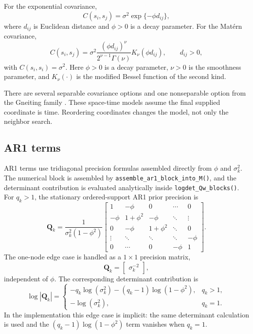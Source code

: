\documentclass[11pt]{article}
\newcommand{\bQ}{\bm{Q}}
\begin{document}
For the exponential covariance,
\begin{equation}
  C(s_i,s_j) = \sigma^2 \exp\{-\phi d_{ij}\},
\end{equation}
where $d_{ij}$ is Euclidean distance and $\phi>0$ is a decay parameter. For the Mat{\'e}rn covariance,
\begin{equation}
  C(s_i,s_j)
    =
    \sigma^2
    \frac{(\phi d_{ij})^\nu}
         {2^{\nu-1}\Gamma(\nu)}
    K_\nu(\phi d_{ij}),
    \qquad d_{ij}>0,
\end{equation}
with $C(s_i,s_i)=\sigma^2$. Here $\phi>0$ is a decay parameter, $\nu>0$ is the smoothness parameter, and $K_\nu(\cdot)$ is the modified Bessel function of the second kind.

There are several separable covariance options and one nonseparable option from the Gneiting family \citep{Gneiting2002}. These space-time models assume the final supplied coordinate is time. Reordering coordinates changes the model, not only the neighbor search.

\subsection{AR1 terms}

AR1 terms use tridiagonal precision formulas assembled directly from $\phi$ and $\sigma_k^2$. The numerical block is assembled by \texttt{assemble\_ar1\_block\_into\_M()}, and the determinant contribution is evaluated analytically inside \texttt{logdet\_Qw\_blocks()}. For $q_k>1$, the stationary ordered-support AR1 prior precision is
\begin{equation}
  \bQ_k =
  \frac{1}{\sigma_k^2(1-\phi^2)}
  \begin{bmatrix}
    1 & -\phi & 0 & \cdots & 0 \\
    -\phi & 1+\phi^2 & -\phi & \ddots & \vdots \\
    0 & -\phi & 1+\phi^2 & \ddots & 0 \\
    \vdots & \ddots & \ddots & \ddots & -\phi \\
    0 & \cdots & 0 & -\phi & 1
  \end{bmatrix}.
\end{equation}
The one-node edge case is handled as a $1\times 1$ precision matrix,
\begin{equation}
  \bQ_k = \begin{bmatrix}\sigma_k^{-2}\end{bmatrix},
\end{equation}
independent of $\phi$.
The corresponding determinant contribution is
\begin{equation}
  \label{eq:logdet-ar1}
  \log|\bQ_k|
  =
  \begin{cases}
    -q_k\log(\sigma_k^2) - (q_k-1)\log(1-\phi^2), & q_k>1,\\
    -\log(\sigma_k^2), & q_k=1.
  \end{cases}
\end{equation}
In the implementation this edge case is implicit: the same determinant calculation is used and the $(q_k-1)\log(1-\phi^2)$ term vanishes when $q_k=1$.
\end{document}
